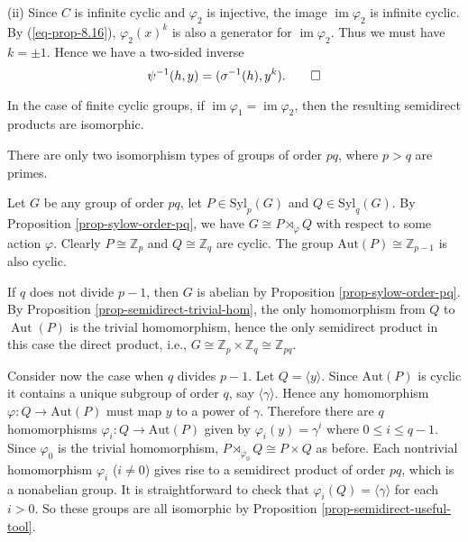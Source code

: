 \begin{sketch}
 	(ii) Since $C$ is infinite cyclic and $\varphi_2$ is injective, the image $\operatorname{im} \varphi_2$ is infinite cyclic. By (\ref{eq-prop-8.16}), $\varphi_2(x)^k$ is also a generator for $\operatorname{im} \varphi_2$. Thus we must have $k = \pm 1$. Hence we have a two-sided inverse
 	\begin{equation*}
 		\psi^{-1}(h,y) = (\sigma^{-1}(h),y^k). \qedhere
 	\end{equation*}
\end{sketch}
\begin{remark}
	In the case of finite cyclic groups, if  $\operatorname{im}\varphi_1 = \operatorname{im}\varphi_2$, then the resulting semidirect products are isomorphic.
\end{remark}
\begin{example}
	There are only two isomorphism types of groups of order $pq$, where $p>q$ are primes.
	
	Let $G$ be any group of order $pq$, let $P \in \text{Syl}_p(G)$ and $Q \in \text{Syl}_q(G)$. By Proposition \ref{prop-sylow-order-pq}, we have $G \cong P \rtimes_\varphi Q$ with respect to some action $\varphi$.
	Clearly  $P \cong \mathbb{Z}_p$ and $Q \cong \mathbb{Z}_q$ are cyclic. The group $\text{Aut}(P)\cong \mathbb{Z}_{p-1}$ is also cyclic. 
	
	If $q$ does not divide $p-1$, then $G$ is abelian by Proposition \ref{prop-sylow-order-pq}. By Proposition \ref{prop-semidirect-trivial-hom},  the only homomorphism from $Q$ to $\operatorname{Aut}(P)$ is the trivial homomorphism, hence the only semidirect product in this case the direct product, i.e., $G \cong \mathbb{Z}_p\times \mathbb{Z}_q \cong \mathbb{Z}_{pq}$.
	
	Consider now the case when $q$ divides  $p-1$. Let $Q = \langle y \rangle$. Since $\text{Aut}(P)$ is cyclic it contains a unique subgroup of order $q$, say $\langle \gamma \rangle$. Hence any homomorphism $\varphi : Q \to \text{Aut}(P)$ must map $y$ to a power of $\gamma$. Therefore there are $q$ homomorphisms $\varphi_i : Q \to \text{Aut}(P)$ given by $\varphi_i(y) = \gamma^i$ where $0 \leq i \leq q-1$. Since $\varphi_0$ is the trivial homomorphism, $P \rtimes_{\varphi_0} Q \cong P \times Q$ as before. Each nontrivial homomorphism $\varphi_i$ ($i\neq 0$)  gives rise to a semidirect product  of order $pq$, which is a nonabelian group. It is straightforward to check that $\varphi_i(Q) = \langle \gamma \rangle$ for each  $i > 0$. So these groups are all isomorphic by Proposition \ref{prop-semidirect-useful-tool}.
\end{example}

